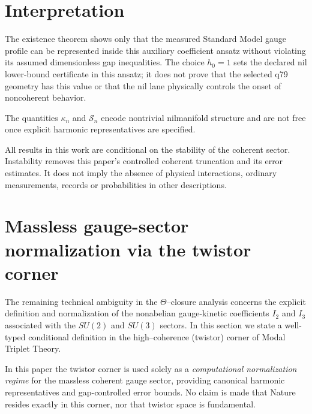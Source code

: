 \documentclass[11pt]{article}
\begin{document}
\section{Interpretation}

The existence theorem shows only that the measured Standard Model gauge
profile can be represented inside this auxiliary coefficient ansatz without
violating its assumed dimensionless gap inequalities. The choice $h_0=1$
sets the declared nil lower-bound certificate in this ansatz; it does not prove that
the selected q79 geometry has this value or that the nil lane physically
controls the onset of noncoherent behavior.

\begin{remark}
The quantities $\kappa_n$ and $\mathcal{S}_n$ encode nontrivial
nilmanifold structure and are not free once explicit harmonic
representatives are specified.
\end{remark}

\begin{remark}
All results in this work are conditional on the stability of the coherent
sector.
Instability removes this paper's controlled coherent truncation and its
error estimates. It does not imply the absence of physical interactions,
ordinary measurements, records or probabilities in other descriptions.
\end{remark}

\section{Massless gauge-sector normalization via the twistor corner}

The remaining technical ambiguity in the $\Theta$--closure analysis concerns
the explicit definition and normalization of the nonabelian gauge-kinetic
coefficients $I_2$ and $I_3$ associated with the $SU(2)$ and $SU(3)$ sectors.
In this section we state a well-typed conditional definition in the
high--coherence (twistor) corner of Modal Triplet Theory.

\begin{remark}
In this paper the twistor corner is used solely as a \emph{computational normalization regime}
for the massless coherent gauge sector, providing canonical harmonic representatives and
gap-controlled error bounds. No claim is made that Nature resides exactly in this corner,
nor that twistor space is fundamental.
\end{remark}
\end{document}
